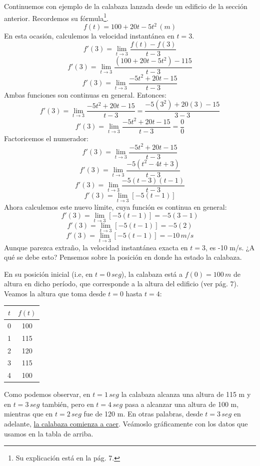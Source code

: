 \documentclass[12pt]{article}
\begin{document}
Continuemos con ejemplo de la calabaza lanzada desde un edificio de la sección anterior. Recordemos su fórmula\footnote{Su explicación está en la pág. 7.}.
\[f(t) = 100 + 20t - 5t^{2} \, (m)\]
En esta ocasión, calculemos la velocidad instantánea en $t = 3$.
\[f'(3) = \lim_{t \to 3} \frac{f(t) - f(3)}{t - 3}\]
\[f'(3) = \lim_{t \to 3} \frac{(100 + 20t - 5t^{2}) - 115}{t - 3}\]
\[f'(3) = \lim_{t \to 3} \frac{-5t^{2} + 20t - 15}{t - 3}\]
Ambas funciones son continuas en general. Entonces:
\[f'(3) = \lim_{t \to 3} \frac{-5t^{2} + 20t - 15}{t - 3} = \frac{-5(3^{2}) + 20(3) - 15}{3 - 3}\]
\[f'(3) = \lim_{t \to 3} \frac{-5t^{2} + 20t - 15}{t - 3} = \frac{0}{0}\]
Factoricemos el numerador:
\[f'(3) = \lim_{t \to 3} \frac{-5t^{2} + 20t - 15}{t - 3}\]
\[f'(3) = \lim_{t \to 3} \frac{-5(t^{2} - 4t + 3)}{t - 3}\]
\[f'(3) = \lim_{t \to 3} \frac{-5(t - 3)(t - 1)}{t - 3}\]
\[f'(3) = \lim_{t \to 3} [-5(t - 1)]\]
Ahora calculemos este nuevo límite, cuya función es continua en general:
\[f'(3) = \lim_{t \to 3} [-5(t - 1)] = -5(3 - 1)\]
\[f'(3) = \lim_{t \to 3} [-5(t - 1)] = -5(2)\]
\[f'(3) = \lim_{t \to 3} [-5(t - 1)] = -10 \, m/s\]
Aunque parezca extraño, la velocidad instantánea exacta en $t = 3$, es -10 m/s. ¿A qué se debe esto? Pensemos sobre la posición en donde ha estado la calabaza.

En su posición inicial (i.e, en $t = 0 \, seg$), la calabaza está a $f(0) = 100 \, m$ de altura en dicho período, que corresponde a la altura del edificio (ver pág. 7). Veamos la altura que toma desde $t = 0$ hasta $t = 4$:

\begin{table}[hbt!]
\centering
\begin{tabular}{c | c}

$t$ & $f(t)$\\
\hline
0 & 100\\
1 & 115\\
2 & 120\\
3 & 115\\
4 & 100\\

\end{tabular}
\end{table}

Como podemos observar, en $t = 1 \, seg$ la calabaza alcanza una altura de 115 m y en $t = 3 \, seg$ también, pero en $t = 4 \, seg$ pasa a alcanzar una altura de 100 m, mientras que en $t = 2 \, seg$ fue de 120 m. En otras palabras, desde $t = 3 \, seg$ en adelante, \underline{la calabaza comienza a caer}. Veámoslo gráficamente con los datos que usamos en la tabla de arriba.
\end{document}

